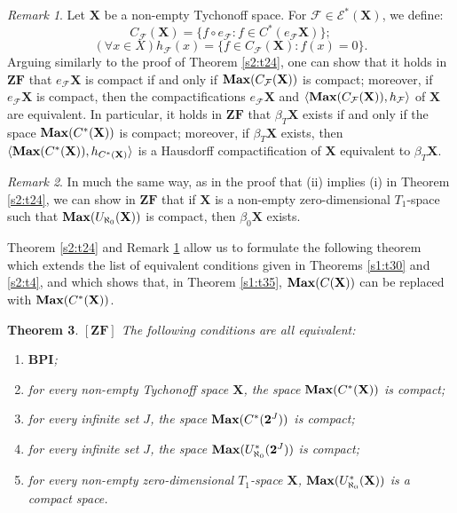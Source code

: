 \documentclass[12pt,twoside,leqno]{article}
\theoremstyle{plain}
\newtheorem{theorem}{Theorem}[section]
\theoremstyle{definition}
\theoremstyle{remark}
\newtheorem{remark}[theorem]{Remark}
\DeclareMathOperator{\BMax}{\bf{Max}}
\begin{document}
\begin{remark}
	\label{s2:r25}
	Let $\mathbf{X}$ be a non-empty Tychonoff space. For $\mathcal{F}\in\mathcal{E}^{\ast}(\mathbf{X})$, we define:
	$$C_{\mathcal{F}}(\mathbf{X})=\{f\circ e_{\mathcal{F}}: f\in C^{\ast}(e_{\mathcal{F}}\mathbf{X})\};$$
	$$(\forall x\in X) h_{\mathcal{F}}(x)=\{f\in C_{\mathcal{F}}(\mathbf{X}): f(x)=0\}.$$
	Arguing similarly to the proof of Theorem \ref{s2:t24}, one can show that it holds in $\mathbf{ZF}$ that $e_{\mathcal{F}}\mathbf{X}$ is compact if and only if $\BMax(C_{\mathcal{F}}(\mathbf{X}))$ is compact; moreover, if $e_{\mathcal{F}}\mathbf{X}$ is compact, then the compactifications $e_{\mathcal{F}}\mathbf{X}$ and $\langle \BMax(C_{\mathcal{F}}(\mathbf{X})), h_{\mathcal{F}}\rangle$ of $\mathbf{X}$ are equivalent. In particular, it holds in $\mathbf{ZF}$ that 
	$\beta_T\mathbf{X}$ exists if and only if the space $\BMax(C^{\ast}(\mathbf{X}))$ is compact; moreover, if $\beta_T\mathbf{X}$ exists, then $\langle \BMax(C^{\ast}(\mathbf{X})), h_{C^{\ast}(\mathbf{X})}\rangle$ is a Hausdorff compactification of $\mathbf{X}$ equivalent to $\beta_T\mathbf{X}$. 
\end{remark}

\begin{remark}
	\label{s2:r26}
	In much the same way, as in the proof that (ii) implies (i) in Theorem \ref{s2:t24}, we can show in $\mathbf{ZF}$ that if $\mathbf{X}$ is a non-empty zero-dimensional $T_1$-space such that $\BMax(U_{\aleph_0}(\mathbf{X}))$ is compact, then $\beta_0\mathbf{X}$ exists.
\end{remark}

Theorem \ref{s2:t24} and Remark \ref{s2:r25} allow us to formulate the following theorem which extends the list of equivalent conditions given in Theorems \ref{s1:t30} and \ref{s2:t4}, and which shows that, in Theorem \ref{s1:t35}, $\BMax(C(\mathbf{X}))$ can be replaced with $\BMax(C^{\ast}(\mathbf{X}))$.

\begin{theorem}
	\label{s2:t27}
	$[\mathbf{ZF}]$
	The following conditions are all equivalent:
	\begin{enumerate}
		\item[(i)] $\mathbf{BPI}$;
		\item[(ii)] for every non-empty Tychonoff space $\mathbf{X}$, the space $\BMax(C^{\ast}(\mathbf{X}))$ is compact;
		\item[(iii)]for every infinite set $J$, the space $\BMax(C^{\ast}(\mathbf{2}^J))$ is compact;
		\item[(iv)] for every infinite set $J$, the space $\BMax(U_{\aleph_0}^{\ast}(\mathbf{2}^J))$ is compact;
		\item[(v)] for every non-empty zero-dimensional $T_1$-space $\mathbf{X}$,  $\BMax(U_{\aleph_0}^{\ast}(\mathbf{X}))$ is a compact space.
	\end{enumerate}
\end{theorem}
\end{document}
